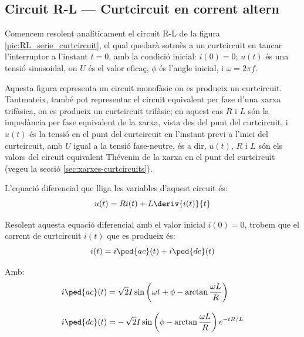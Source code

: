 \subsection {Circuit R-L --- Curtcircuit en corrent altern}\label{sec:ccRL}

Comencem resolent analíticament el circuit R-L de la figura \vref{pic:RL_serie_curtcircuit}, el qual quedarà sotmès a un curtcircuit en tancar l'interruptor a l'instant $t=0$, amb la condició inicial: $i(0) = 0$; $u(t)$ és una tensió sinusoidal, on $U$ és el valor eficaç, $\phi$ és l'angle inicial, i $\omega = 2 \pi f$.

Aquesta figura representa un circuit monofàsic on es produeix un curtcircuit. Tantmateix, també pot representar el circuit equivalent per fase d'una xarxa trifàsica, on es produeix un curtcircuit trifàsic; en aquest cas $R$ i $L$ són la impedància per fase equivalent de la xarxa, vista des del punt del curtcircuit, i $u(t)$ és la tensió en el punt del curtcircuit en l'instant previ a l'inici del curtcircuit, amb $U$ igual a la tensió fase-neutre, és a dir,  $u(t)$,  $R$ i $L$ són els valors   del circuit equivalent Thévenin de la xarxa en el punt del curtcircuit (vegeu la secció \ref{sec:xarxes-curtcircuits}).

\begin{center}
    
    \label{pic:RL_serie_curtcircuit}
\end{center}

L'equació diferencial que lliga les variables d'aquest circuit és:
\begin{equation}
    u(t) = R i(t) + L \deriv{i(t)}{t}
\end{equation}

Resolent aquesta equació diferencial amb el valor inicial $i(0)=0$, trobem que el corrent de curtcircuit $i(t)$  que es produeix  és:
\begin{equation}
    i(t) = i\ped{ac}(t) + i\ped{dc}(t)
    \label{eq:RL_serie_curtcircuit_icc}
\end{equation}

Amb:
\begin{subequations}
\begin{align}
    i\ped{ac}(t) &= \sqrt{2} I \sin\left(\omega t + \phi - \arctan\frac{\omega L}{R}\right) \label{eq:RL_serie_curtcircuit_iac}\\[3mm]
    i\ped{dc}(t) &= -\,\sqrt{2} I\sin\left(\phi - \arctan\frac{\omega L}{R}\right) e^{-t R/L}\label{eq:RL_serie_curtcircuit_idc}
\end{align}
\end{subequations}

